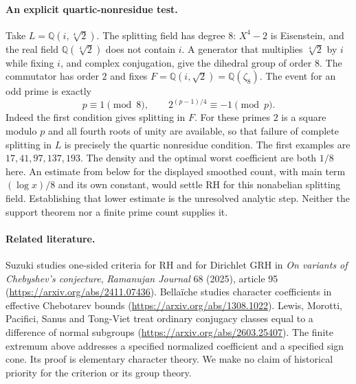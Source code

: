 \paragraph{An explicit quartic-nonresidue test.}
Take $L=\mathbb Q(i,\sqrt[4]{2})$. The splitting field has degree $8$:
$X^4-2$ is Eisenstein, and the real field $\mathbb Q(\sqrt[4]{2})$
does not contain $i$. A generator that multiplies $\sqrt[4]{2}$ by
$i$ while fixing $i$, and complex conjugation, give the dihedral group
of order $8$. The commutator has order $2$ and fixes
$F=\mathbb Q(i,\sqrt2)=\mathbb Q(\zeta_8)$.
The event for an odd prime is exactly
\[
 p\equiv1\pmod8,\qquad 2^{(p-1)/4}\equiv-1\pmod p.
\]
Indeed the first condition gives splitting in $F$. For these primes
$2$ is a square modulo $p$ and all fourth roots of unity are available,
so that failure of complete splitting in $L$ is precisely the quartic
nonresidue condition. The first examples are $17,41,97,137,193$.
The density and the optimal worst coefficient are both $1/8$ here.
An estimate from below for the displayed smoothed count, with main
term $(\log x)/8$ and its own constant, would settle RH for this
nonabelian splitting field. Establishing that lower estimate is the
unresolved analytic step. Neither the support theorem nor a finite
prime count supplies it.

\paragraph{Related literature.}
Suzuki studies one-sided criteria for RH and for Dirichlet GRH in
\emph{On variants of Chebyshev's conjecture},
\emph{Ramanujan Journal} 68 (2025), article 95
(\url{https://arxiv.org/abs/2411.07436}).
Bella\"iche studies character coefficients in effective Chebotarev
bounds (\url{https://arxiv.org/abs/1308.1022}).
Lewis, Morotti, Pacifici, Sanus and Tong-Viet treat ordinary conjugacy
classes equal to a difference of normal subgroups
(\url{https://arxiv.org/abs/2603.25407}).
The finite extremum above addresses a specified normalized coefficient
and a specified sign cone. Its proof is elementary character theory.
We make no claim of historical priority for the criterion or its group
theory.
